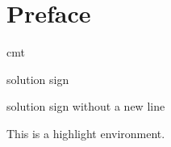 \chapter{Preface}

\cmt    cmt

\sol    solution sign

\solc   solution sign without a new line

\vspace{1cm}




\vspace{1cm}

\begin{ilight}
    This is a highlight environment.
\end{ilight}